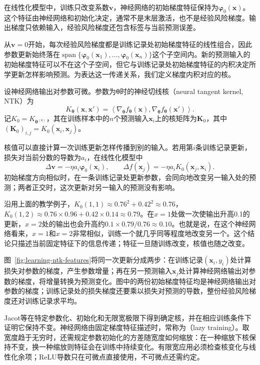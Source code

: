 在线性化模型中，训练只改变系数$\bm v$，神经网络的初始梯度特征保持为$\bm\varphi_0(\bm x)$。这个特征由神经网络和初始化决定，通常不是末层激活，也不是经验风险梯度。输出梯度只依赖输入，经验风险梯度还包含标签与当前预测误差。

从$\bm v=0$开始，每次经验风险梯度都是训练记录处初始梯度特征的线性组合，因此参数更新始终落在$\operatorname{span}\{\bm\varphi_0(\bm x_1),\ldots,\bm\varphi_0(\bm x_n)\}$这个子空间内。新的预测输入的初始梯度特征可以不在这个子空间，但它与训练记录处初始梯度特征的内积决定所学更新怎样影响预测。为表达这一传递关系，我们定义梯度内积对应的核。

\begin{definition}[神经切线核]
\label{def:neural-tangent-kernel}
设神经网络输出对参数可微。参数为$\bm\theta$时的神经切线核（neural tangent kernel, NTK）为
\[
 K_{\bm\theta}(\bm x,\bm x')=
 \left\langle\nabla_{\bm\theta}f_{\bm\theta}(\bm x),
               \nabla_{\bm\theta}f_{\bm\theta}(\bm x')\right\rangle.
\]
记$K_0=K_{\bm\theta^{(0)}}$，其在训练样本中的$n$个预测输入$\bm x_i$上的核矩阵为$\bm K_0$，其中
$(\bm K_0)_{i,j}=K_0(\bm x_i,\bm x_j)$。
\end{definition}

核值可以直接计算一次训练更新怎样传播到别的输入。若用第$i$条训练记录更新，损失对当前分数的导数为$a_i$，在线性化模型中
\[
 \Delta\bm v=-\eta a_i\bm\varphi_0(\bm x_i),\qquad
 \Delta f(\bm x_j)=-\eta a_i K_0(\bm x_j,\bm x_i).
\]
初始梯度方向相似时，在一条训练记录处更新参数，会同向地改变另一输入处的预测；两者正交时，这次更新对另一输入的预测没有影响。

沿用上面的教学例子，$K_0(1,1)\approx0.76^2+0.42^2\approx0.76$，$K_0(1,2)\approx0.76\times0.96+0.42\times0.14\approx0.79$。在$x=1$处做一次使输出升高0.1的更新，$x=2$处的输出也会升高约$0.1\times0.79/0.76\approx0.10$。也就是说，在这个神经网络看来，$x=1$和$x=2$非常相似，训练一个就几乎同等程度地改变另一个。这个结论只描述当前固定特征下的信息传递；特征一旦随训练改变，核值也随之改变。

图~\ref{fig:learning-ntk-features}将同一次更新分成两步：在训练记录$(\bm x_i,y_i)$处计算损失对参数的梯度，产生参数增量；再在另一预测输入$\bm x_j$处计算神经网络输出对参数的梯度，将增量转换为预测变化。图中的两份初始梯度特征均是神经网络输出对参数的梯度；训练记录处的损失梯度还要乘以损失对预测的导数，整份经验风险梯度还对训练记录求平均。

Jacot等在特定参数化、初始化和无限宽极限下得到确定核，并在相应训练条件下证明它保持不变。神经网络由固定梯度特征描述时，常称为（lazy training）。取宽度趋于无穷时，还需规定参数初始化的方差随宽度如何缩放：在一种缩放下核保持不变，换一种缩放则特征会在训练中持续变化。有限宽应用必须检查核变化与线性化余项；ReLU导数只在可微点直接使用，不可微点还需约定。

